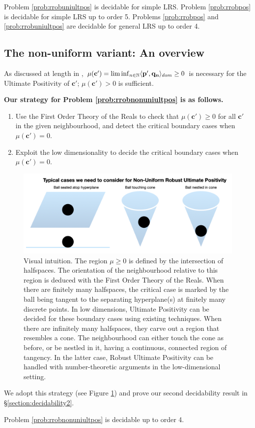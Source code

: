 \begin{theorem}
\label{thm:decide}
Problem \ref{prob:rrobuniultpos} is decidable for simple LRS. Problem \ref{prob:rrobpos} is decidable for simple LRS up to order 5. Problems \ref{prob:rrobpos} and \ref{prob:rrobuniultpos} are decidable for general LRS up to order 4.
\end{theorem}

\subsection{The non-uniform variant: An overview}

As discussed at length in \cite{originalstacs,originalarxiv}, $\mu(\mathbf{c'})= \liminf_{n \in \mathbb{N}} \langle\mathbf{p'}, \mathbf{q_n}\rangle_{dom} \ge 0$ is necessary for the Ultimate Positivity of $\mathbf{c'}$; $\mu(\mathbf{c'}) > 0$ is sufficient.

\textbf{Our strategy for Problem \ref{prob:rrobnonuniultpos} is as follows.}
\begin{enumerate}
\item Use the First Order Theory of the Reals to check that $\mu(\mathbf{c'}) \ge 0$ for all $\mathbf{c'}$ in the given neighbourhood, and detect the critical boundary cases when $\mu(\mathbf{c'}) = 0$.
\item Exploit the low dimensionality to decide the critical boundary cases when $\mu(\mathbf{c'}) = 0$.
\end{enumerate}

\begin{figure}[h]

\includegraphics[width=\textwidth]{picture1.png}
\caption{Visual intuition. The region $\mu \ge 0$ is defined by the intersection of halfspaces. The orientation of the neighbourhood relative to this region is deduced with the First Order Theory of the Reals. When there are finitely many halfspaces, the critical case is marked by the ball being tangent to the separating hyperplane(s) at finitely many discrete points. In low dimensions, Ultimate Positivity can be decided for these boundary cases using existing techniques. When there are infinitely many halfspaces, they carve out a region that resembles a cone. The neighbourhood can either touch the cone as before, or be nestled in it, having a continuous, connected region of tangency. In the latter case, Robust Ultimate Positivity can be handled with number-theoretic arguments in the low-dimensional setting.}
\label{fig:geometricpicture}
\end{figure}

We adopt this strategy (see Figure \ref{fig:geometricpicture}) and prove our second decidability result in \S\ref{section:decidability2}.
\begin{theorem}
\label{thm:decide2}
Problem \ref{prob:rrobnonuniultpos} is decidable up to order 4.
\end{theorem}




